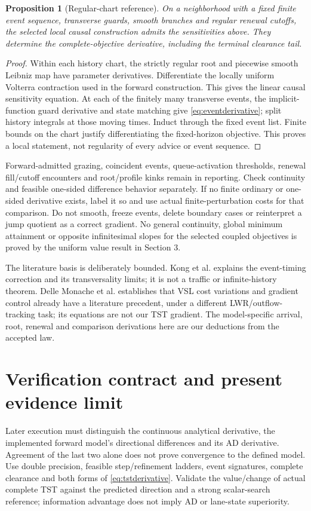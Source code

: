 \documentclass[11pt,a4paper]{article}
\newtheorem{proposition}{Proposition}
\begin{document}
\begin{proposition}[Regular-chart reference]
On a neighborhood with a fixed finite event sequence, transverse guards,
smooth branches and regular renewal cutoffs, the selected local causal
construction admits the sensitivities above. They determine the
complete-objective derivative, including the terminal clearance tail.
\end{proposition}
\begin{proof}
Within each history chart, the strictly regular root and piecewise smooth
Leibniz map have parameter derivatives. Differentiate the locally uniform
Volterra contraction used in the forward construction. This gives the
linear causal sensitivity equation. At each of the finitely many transverse
events, the implicit-function guard derivative and state matching give
\eqref{eq:eventderivative}; split history integrals at those moving times.
Induct through the fixed event list. Finite bounds on the chart justify
differentiating the fixed-horizon objective. This proves a local statement,
not regularity of every advice or event sequence.
\end{proof}

Forward-admitted grazing, coincident events, queue-activation thresholds,
renewal fill/cutoff encounters and root/profile kinks remain in reporting.
Check continuity and feasible one-sided difference behavior separately.
If no finite ordinary or one-sided derivative exists, label it so and use
actual finite-perturbation costs for that comparison. Do not smooth,
freeze events, delete boundary cases or reinterpret a jump quotient as a
correct gradient. No general continuity, global minimum attainment or
opposite infinitesimal slopes for the selected coupled objectives is
proved by the uniform value result in Section 3.

The literature basis is deliberately bounded. Kong et al. explains the
event-timing correction and its transversality limits; it is not a traffic
or infinite-history theorem. Delle Monache et al. establishes that VSL
cost variations and gradient control already have a literature precedent,
under a different LWR/outflow-tracking task; its equations are not our TST
gradient. The model-specific arrival, root, renewal and comparison
derivations here are our deductions from the accepted law.

\section{Verification contract and present evidence limit}
Later execution must distinguish the continuous analytical derivative,
the implemented forward model's directional differences and its AD
derivative. Agreement of the last two alone does not prove convergence to
the defined model. Use double precision, feasible step/refinement ladders,
event signatures, complete clearance and both forms of
\eqref{eq:tstderivative}. Validate the value/change of actual complete TST
against the predicted direction and a strong scalar-search reference;
information advantage does not imply AD or lane-state superiority.
\end{document}
